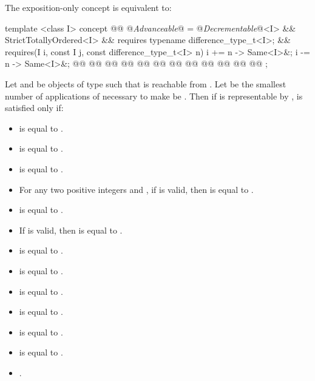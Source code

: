 \pnum
The exposition-only  concept is equivalent to:
\begin{codeblock}
template <class I>
concept @@ @\textit{Advanceable}@ =
  @\textit{Decrementable}@<I> && StrictTotallyOrdered<I> &&
  requires { typename difference_type_t<I>; } &&
  requires(I i, const I j, const difference_type_t<I> n) {
    { i += n } -> Same<I>&;
    { i -= n } -> Same<I>&;
    @@
    @@
    @@
    @@
    @@
    @@
    @@
    @@
    @@
    @@
    @@
    @@
  };
\end{codeblock}

Let  and  be objects of type  such that  is
reachable from . Let  be the smallest number of applications
of  necessary to make  be .  Then if
 is representable by ,
 is satisfied only if:
\begin{itemize}
\item {} is equal to .
\item {} is equal to .
\item {} is equal to .
\item For any two positive integers  and , if
 is valid, then  is equal to
.
\item {} is equal to .
\item If  is valid, then  is equal to
.
\item {} is equal to .
\item {} is equal to .
\item {} is equal to .
\item {} is equal to .
\item {} is equal to .
\item {} is equal to .
\item {}.
\end{itemize}

